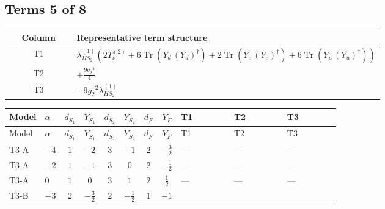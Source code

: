 \documentclass[8pt]{article}
\begin{document}
\begin{landscape}
\subsection*{Terms 5 of 8}
\begin{center}
\begin{tabular}{@{}c >{\raggedright\arraybackslash}p{0.82\linewidth}@{}}
\toprule
Column & Representative term structure \\
\midrule
T1 & \(\displaystyle {\lambda_{HS_2}^{(1)}} (2 T_{\nu}^{(2)}+6 \operatorname{Tr}\!\left({Y_d}\,\left({Y_d}\right)^{\dagger}\right)+2 \operatorname{Tr}\!\left({Y_e}\,\left({Y_e}\right)^{\dagger}\right)+6 \operatorname{Tr}\!\left({Y_u}\,\left({Y_u}\right)^{\dagger}\right))\) \\
\midrule
T2 & \(\displaystyle +\frac{9 {g_2}^4}{4}\) \\
\midrule
T3 & \(\displaystyle -9 {g_2}^2 {\lambda_{HS_2}^{(1)}}\) \\
\midrule
\bottomrule
\end{tabular}
\end{center}
\smallskip
\tiny
\begin{longtable}{@{}llcccccc >{\raggedright\arraybackslash}p{0.21\linewidth} >{\raggedright\arraybackslash}p{0.21\linewidth} >{\raggedright\arraybackslash}p{0.21\linewidth}@{}}
\toprule
Model & $\alpha$ & $d_{S_1}$ & $Y_{S_1}$ & $d_{S_2}$ & $Y_{S_2}$ & $d_F$ & $Y_F$ & T1 & T2 & T3 \\
\midrule
\endfirsthead
\toprule
Model & $\alpha$ & $d_{S_1}$ & $Y_{S_1}$ & $d_{S_2}$ & $Y_{S_2}$ & $d_F$ & $Y_F$ & T1 & T2 & T3 \\
\midrule
\endhead
T3-A & $-4$ & $1$ & $-2$ & $3$ & $-1$ & $2$ & $-\frac{3}{2}$ & --- & --- & --- \\
\midrule
T3-A & $-2$ & $1$ & $-1$ & $3$ & $0$ & $2$ & $-\frac{1}{2}$ & --- & --- & --- \\
\midrule
T3-A & $0$ & $1$ & $0$ & $3$ & $1$ & $2$ & $\frac{1}{2}$ & --- & --- & --- \\
\midrule
T3-B & $-3$ & $2$ & $-\frac{3}{2}$ & $2$ & $-\frac{1}{2}$ & $1$ & $-1$ & \scriptsize\adjustbox{max width=\linewidth}{$\begin{gathered} {\lambda_{HS_2}^{(1)}} (2 T_{\nu}^{(2)}+6 \operatorname{Tr}\!\left({Y_d}\,\left({Y_d}\right)^{\dagger}\right)+2 \operatorname{Tr}\!\left({Y_e}\,\left({Y_e}\right)^{\dagger}\right)+6 \operatorname{Tr}\!\left({Y_u}\,\left({Y_u}\right)^{\dagger}\right))\end{gathered}$} & \scriptsize\adjustbox{max width=\linewidth}{$\begin{gathered} +\frac{9 {g_2}^4}{4}\end{gathered}$} & \scriptsize\adjustbox{max width=\linewidth}{$\begin{gathered} -9 {g_2}^2 {\lambda_{HS_2}^{(1)}}\end{gathered}$} \\

\end{longtable}
\end{landscape}
\end{document}
